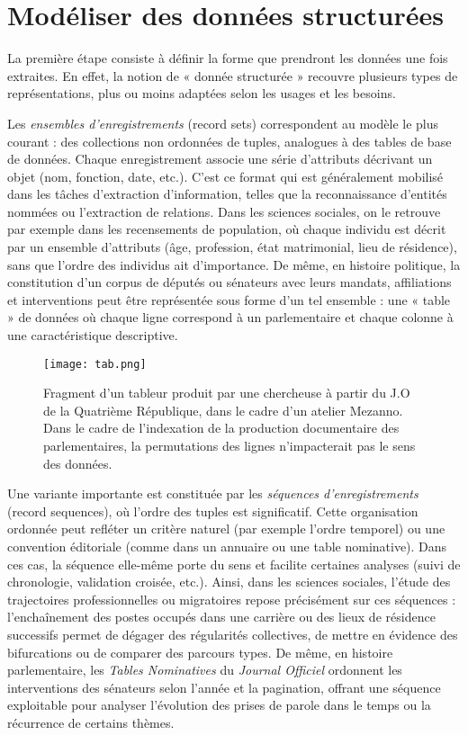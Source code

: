 \section{Modéliser des données structurées}

La première étape consiste à définir la forme que prendront les données une fois extraites. En effet, la notion de « donnée structurée » recouvre plusieurs types de représentations, plus ou moins adaptées selon les usages et les besoins.

Les \emph{ensembles d’enregistrements} (record sets) correspondent au modèle le plus courant : des collections non ordonnées de tuples, analogues à des tables de base de données. Chaque enregistrement associe une série d’attributs décrivant un objet (nom, fonction, date, etc.). C’est ce format qui est généralement mobilisé dans les tâches d’extraction d’information, telles que la reconnaissance d’entités nommées ou l’extraction de relations. Dans les sciences sociales, on le retrouve par exemple dans les recensements de population, où chaque individu est décrit par un ensemble d’attributs (âge, profession, état matrimonial, lieu de résidence), sans que l’ordre des individus ait d’importance. De même, en histoire politique, la constitution d’un corpus de députés ou sénateurs avec leurs mandats, affiliations et interventions peut être représentée sous forme d’un tel ensemble : une « table » de données où chaque ligne correspond à un parlementaire et chaque colonne à une caractéristique descriptive.

\begin{figure}[htbp]
\centering
\texttt{[image: tab.png]}
\caption{Fragment d'un tableur produit par une chercheuse à partir du J.O de la Quatrième République, dans le cadre d'un atelier Mezanno. Dans le cadre de l'indexation de la production documentaire des parlementaires, la permutations des lignes n'impacterait pas le sens des données.}
\label{fig:tab}
\end{figure}

Une variante importante est constituée par les \emph{séquences d’enregistrements} (record sequences), où l’ordre des tuples est significatif. Cette organisation ordonnée peut refléter un critère naturel (par exemple l’ordre temporel) ou une convention éditoriale (comme dans un annuaire ou une table nominative). Dans ces cas, la séquence elle-même porte du sens et facilite certaines analyses (suivi de chronologie, validation croisée, etc.). Ainsi, dans les sciences sociales, l’étude des trajectoires professionnelles ou migratoires repose précisément sur ces séquences : l’enchaînement des postes occupés dans une carrière ou des lieux de résidence successifs permet de dégager des régularités collectives, de mettre en évidence des bifurcations ou de comparer des parcours types. De même, en histoire parlementaire, les \emph{Tables Nominatives} du \emph{Journal Officiel} ordonnent les interventions des sénateurs selon l’année et la pagination, offrant une séquence exploitable pour analyser l’évolution des prises de parole dans le temps ou la récurrence de certains thèmes.

